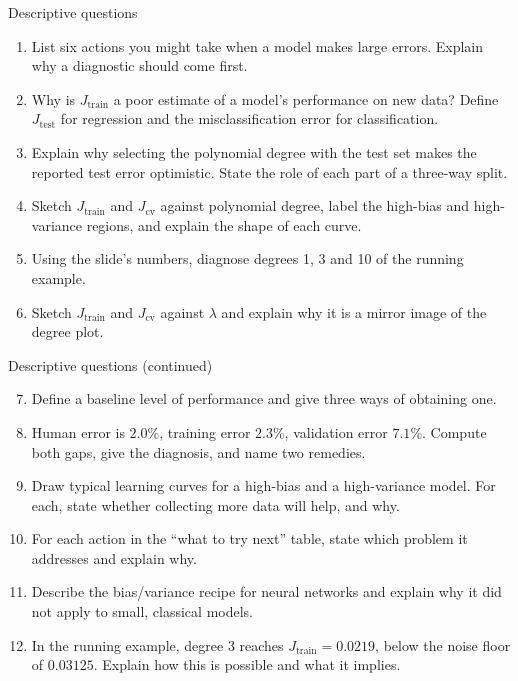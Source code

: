 \documentclass[aspectratio=169,10pt]{beamer}
\begin{document}
\begin{frame}{Descriptive questions}
  \footnotesize
  \begin{enumerate}
    \item List six actions you might take when a model makes large errors. Explain why a
          diagnostic should come first. \hfill{}
    \item Why is $J_{\text{train}}$ a poor estimate of a model's performance on new data?
          Define $J_{\text{test}}$ for regression and the misclassification error for
          classification. \hfill{}
    \item Explain why selecting the polynomial degree with the test set makes the reported
          test error optimistic. State the role of each part of a three-way split.
          \hfill{}
    \item Sketch $J_{\text{train}}$ and $J_{\text{cv}}$ against polynomial degree, label
          the high-bias and high-variance regions, and explain the shape of each curve.
          \hfill{}
    \item Using the slide's numbers, diagnose degrees 1, 3 and 10 of the running example.
          \hfill{}
    \item Sketch $J_{\text{train}}$ and $J_{\text{cv}}$ against $\lambda$ and explain why
          it is a mirror image of the degree plot. \hfill{}
  \end{enumerate}
\end{frame}

\begin{frame}{Descriptive questions (continued)}
  \footnotesize
  \begin{enumerate}\setcounter{enumi}{6}
    \item Define a baseline level of performance and give three ways of obtaining one.
          \hfill{}
    \item Human error is $2.0\%$, training error $2.3\%$, validation error $7.1\%$. Compute
          both gaps, give the diagnosis, and name two remedies. \hfill{}
    \item Draw typical learning curves for a high-bias and a high-variance model. For each,
          state whether collecting more data will help, and why. \hfill{}
    \item For each action in the ``what to try next'' table, state which problem it
          addresses and explain why. \hfill{}
    \item Describe the bias/variance recipe for neural networks and explain why it did not
          apply to small, classical models. \hfill{}
    \item In the running example, degree 3 reaches $J_{\text{train}}=0.0219$, below the
          noise floor of $0.03125$. Explain how this is possible and what it implies.
          \hfill{}
  \end{enumerate}
\end{frame}
\end{document}
